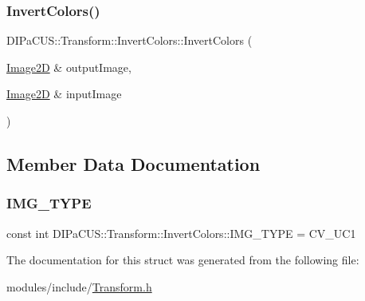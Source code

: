 \subsubsection{\texorpdfstring{Invert\+Colors()}{InvertColors()}}
{\footnotesize\ttfamily D\+I\+Pa\+C\+U\+S\+::\+Transform\+::\+Invert\+Colors\+::\+Invert\+Colors (\begin{DoxyParamCaption}\item[{\mbox{\hyperlink{structDIPaCUS_1_1Transform_1_1InvertColors_a0520b12f53327b6240a03bd9db4dfda7}{Image2D}} \&}]{output\+Image,  }\item[{\mbox{\hyperlink{structDIPaCUS_1_1Transform_1_1InvertColors_a0520b12f53327b6240a03bd9db4dfda7}{Image2D}} \&}]{input\+Image }\end{DoxyParamCaption})\hspace{0.3cm}{\ttfamily [inline]}}



\subsection{Member Data Documentation}
\mbox{\label{structDIPaCUS_1_1Transform_1_1InvertColors_a98282fd7c160fa6aa172d4200d920c86}} 
\subsubsection{\texorpdfstring{I\+M\+G\+\_\+\+T\+Y\+PE}{IMG\_TYPE}}
{\footnotesize\ttfamily const int D\+I\+Pa\+C\+U\+S\+::\+Transform\+::\+Invert\+Colors\+::\+I\+M\+G\+\_\+\+T\+Y\+PE = C\+V\+\_\+U\+C1}



The documentation for this struct was generated from the following file\+:\begin{DoxyCompactItemize}
\item 
modules/include/\mbox{\hyperlink{Transform_8h}{Transform.\+h}}\end{DoxyCompactItemize}
